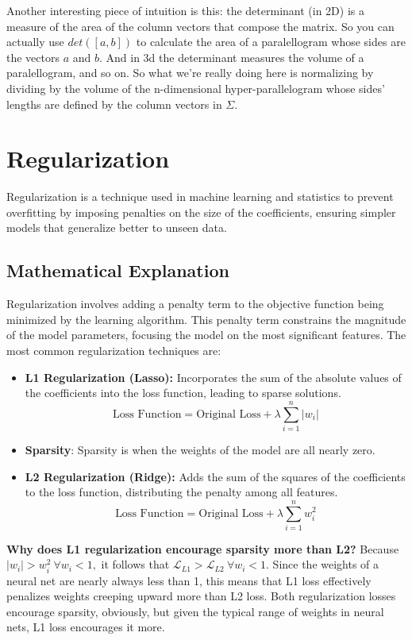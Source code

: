 \documentclass[12pt]{article}
\begin{document}
Another interesting piece of intuition is this: the determinant (in 2D) is a measure of the area of the column vectors that compose the matrix. So you can actually use \(det([a,b])\) to calculate the area of a paralellogram whose sides are the vectors \(a\) and \(b\). And in 3d the determinant measures the volume of a paralellogram, and so on. So what we're really doing here is normalizing by dividing by the volume of the n-dimensional hyper-parallelogram whose sides' lengths are defined by the column vectors in \(\Sigma\). 

\section{Regularization}

Regularization is a technique used in machine learning and statistics to prevent overfitting by imposing penalties on the size of the coefficients, ensuring simpler models that generalize better to unseen data.

\subsection{Mathematical Explanation}

Regularization involves adding a penalty term to the objective function being minimized by the learning algorithm. This penalty term constrains the magnitude of the model parameters, focusing the model on the most significant features. The most common regularization techniques are:

\begin{itemize}
    \item \textbf{L1 Regularization (Lasso):} Incorporates the sum of the absolute values of the coefficients into the loss function, leading to sparse solutions.
    \[ \text{Loss Function} = \text{Original Loss} + \lambda \sum_{i=1}^{n} |w_i| \]
	\item \textbf{Sparsity}: Sparsity is when the weights of the model are all nearly zero. 
    
    \item \textbf{L2 Regularization (Ridge):} Adds the sum of the squares of the coefficients to the loss function, distributing the penalty among all features.
    \[ \text{Loss Function} = \text{Original Loss} + \lambda \sum_{i=1}^{n} w_i^2 \]
\end{itemize}

\textbf{Why does L1 regularization encourage sparsity more than L2?} Because \(|w_i| > w_i^2 \ \forall w_i < 1,\) it follows that \( \mathcal{L}_{L1} > \mathcal{L}_{L2} \ \forall w_i < 1\). Since the weights of a neural net are nearly always less than 1, this means that L1 loss effectively penalizes weights creeping upward more than L2 loss. Both regularization losses encourage sparsity, obviously, but given the typical range of weights in neural nets, L1 loss encourages it more. 
\end{document}
